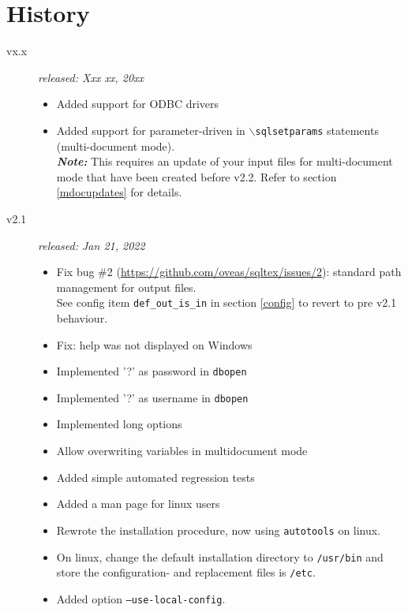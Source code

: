 \documentclass{article}
\newcommand{\bs}{\ensuremath{\backslash}}
\begin{document}
\section{History}

\begin{description}
\item[vx.x] \textit{released: Xxx xx, 20xx}
\begin{itemize}
\item Added support for ODBC drivers
\item Added support for parameter-driven in \texttt{\bs sqlsetparams} statements (multi-document mode).\\
\textit{\textbf{Note:}} This requires an update of your input files for multi-document mode that have been created before v2.2. Refer to section \ref{mdocupdates} for details.
\end{itemize}

\item[v2.1] \textit{released: Jan 21, 2022}
\begin{itemize}
\item Fix bug \#2 (\url{https://github.com/oveas/sqltex/issues/2}): standard path management for output files.\\
See config item \texttt{def\_out\_is\_in} in section \ref{config} to revert to pre v2.1 behaviour.
\item Fix: help was not displayed on Windows
\item Implemented '?' as password in \texttt{dbopen}
\item Implemented '?' as username in \texttt{dbopen}
\item Implemented long options
\item Allow overwriting variables in multidocument mode
\item Added simple automated regression tests
\item Added a man page for linux users
\item Rewrote the installation procedure, now using \texttt{autotools} on linux.
\item On linux, change the default installation directory to \texttt{/usr/bin} and store the configuration- and replacement files is \texttt{/etc}.
\item Added option \texttt{--use-local-config}.
\end{itemize}


\end{description}
\end{document}
